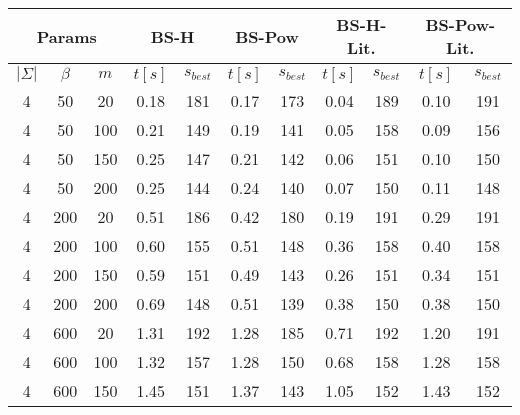 \documentclass{article}
\begin{document}
    \begin{center}
        \begin{tabular}{| c c c | c c | c c | c c | c c |}
            \hline
            \multicolumn{3}{|c}{Params} & \multicolumn{2}{|c|}{BS-H} & \multicolumn{2}{|c|}{BS-Pow} & \multicolumn{2}{c|}{BS-H-Lit.} & \multicolumn{2}{c|}{BS-Pow-Lit.}\\
            \hline
            $|\Sigma|$ & $\beta$ & $m$ & $t[s]$ & $s_{best}$ & $t[s]$ & $s_{best}$ & $t[s]$ & $s_{best}$ & $t[s]$ & $s_{best}$ \\
            \hline
            4          & 50      & 20  & 0.18   & 181        & 0.17   & 173        & 0.04   & 189        & 0.10   & 191        \\
            \hline
            4          & 50      & 100 & 0.21   & 149        & 0.19   & 141        & 0.05   & 158        & 0.09   & 156        \\
            \hline
            4          & 50      & 150 & 0.25   & 147        & 0.21   & 142        & 0.06   & 151        & 0.10   & 150        \\
            \hline
            4          & 50      & 200 & 0.25   & 144        & 0.24   & 140        & 0.07   & 150        & 0.11   & 148        \\
            \hline
            4          & 200     & 20  & 0.51   & 186        & 0.42   & 180        & 0.19   & 191        & 0.29   & 191        \\
            \hline
            4          & 200     & 100 & 0.60   & 155        & 0.51   & 148        & 0.36   & 158        & 0.40   & 158        \\
            \hline
            4          & 200     & 150 & 0.59   & 151        & 0.49   & 143        & 0.26   & 151        & 0.34   & 151        \\
            \hline
            4          & 200     & 200 & 0.69   & 148        & 0.51   & 139        & 0.38   & 150        & 0.38   & 150        \\
            \hline
            4          & 600     & 20  & 1.31   & 192        & 1.28   & 185        & 0.71   & 192        & 1.20   & 191        \\
            \hline
            4          & 600     & 100 & 1.32   & 157        & 1.28   & 150        & 0.68   & 158        & 1.28   & 158        \\
            \hline
            4          & 600     & 150 & 1.45   & 151        & 1.37   & 143        & 1.05   & 152        & 1.43   & 152        \\

\end{tabular}
\end{center}
\end{document}
